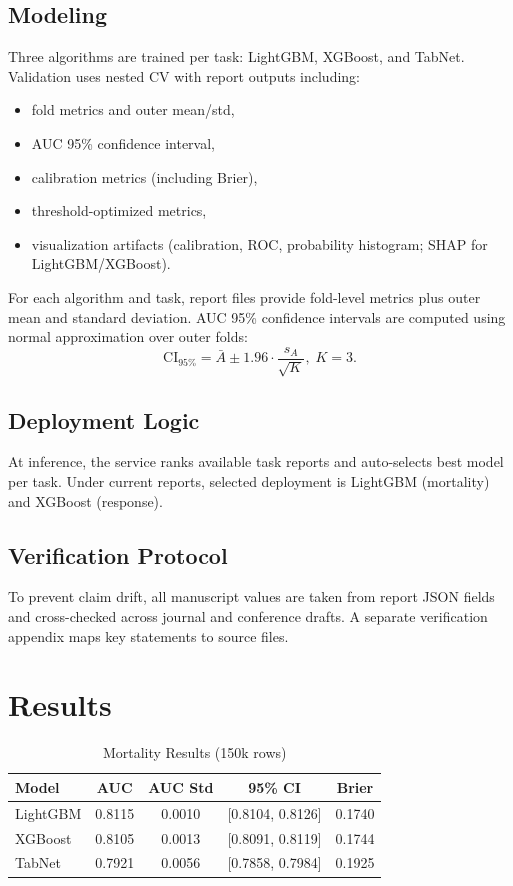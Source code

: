 \documentclass[conference]{IEEEtran}
\begin{document}
\subsection{Modeling}
Three algorithms are trained per task: LightGBM, XGBoost, and TabNet. Validation uses nested CV with report outputs including:
\begin{itemize}
    \item fold metrics and outer mean/std,
    \item AUC 95\% confidence interval,
    \item calibration metrics (including Brier),
    \item threshold-optimized metrics,
    \item visualization artifacts (calibration, ROC, probability histogram; SHAP for LightGBM/XGBoost).
\end{itemize}

For each algorithm and task, report files provide fold-level metrics plus outer mean and standard deviation. AUC 95\% confidence intervals are computed using normal approximation over outer folds:
\begin{equation}
\mathrm{CI}_{95\%} = \bar{A} \pm 1.96 \cdot \frac{s_A}{\sqrt{K}}, \; K=3.
\end{equation}

\subsection{Deployment Logic}
At inference, the service ranks available task reports and auto-selects best model per task. Under current reports, selected deployment is LightGBM (mortality) and XGBoost (response).

\subsection{Verification Protocol}
To prevent claim drift, all manuscript values are taken from report JSON fields and cross-checked across journal and conference drafts. A separate verification appendix maps key statements to source files.

\section{Results}
\begin{table}[htbp]
\caption{Mortality Results (150k rows)}
\centering
\small
\begin{tabular}{lcccc}
\toprule
Model & AUC & AUC Std & 95\% CI & Brier \\
\midrule
LightGBM & 0.8115 & 0.0010 & [0.8104, 0.8126] & 0.1740 \\
XGBoost & 0.8105 & 0.0013 & [0.8091, 0.8119] & 0.1744 \\
TabNet & 0.7921 & 0.0056 & [0.7858, 0.7984] & 0.1925 \\
\bottomrule
\end{tabular}
\end{table}
\end{document}
